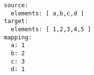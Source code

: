 \begin{verbatim}
source:
  elements: [ a,b,c,d ]
target:
  elements: [ 1,2,3,4,5 ]
mapping:
  a: 1
  b: 2
  c: 3
  d: 1

\end{verbatim}